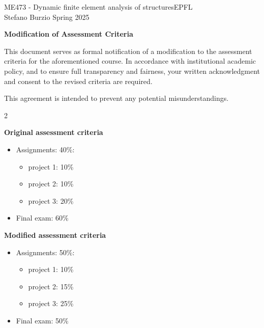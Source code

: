 \documentclass[12pt]{article}
\begin{document}
\noindent ME473 - Dynamic finite element analysis of structures\hfill EPFL\\
Stefano Burzio \hfill Spring 2025\\
\vspace{0.3cm}

\hspace*{\fill}\textbf{\Large Modification of Assessment Criteria}\hspace*{\fill}

\hrulefill
\vspace{0.5cm}


This document serves as formal notification of a modification to the assessment criteria for the aforementioned course. In accordance with institutional academic policy, and to ensure full transparency and fairness, your written acknowledgment and consent to the revised criteria are required.

This agreement is intended to prevent any potential misunderstandings.
\begin{multicols}{2}

\vspace{0.5cm}
\textbf{Original assessment criteria}
\begin{itemize}
\item Assignments: 40\%: 
\begin{itemize}
\item project 1: 10\%
\item project 2: 10\%
\item project 3: 20\%
\end{itemize}
\item Final exam: 60\%
\end{itemize}

\vspace{0.2cm}
\textbf{Modified assessment criteria}
\begin{itemize}
\item Assignments: 50\%: 
\begin{itemize}
\item project 1: 10\%
\item project 2: 15\%
\item project 3: 25\%
\end{itemize}
\item Final exam: 50\%
\end{itemize}
\end{multicols}
\end{document}
